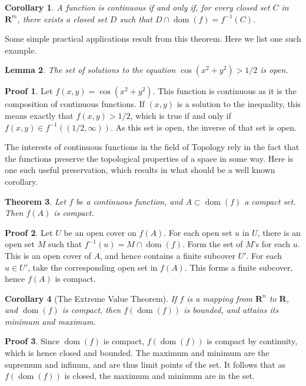 \documentclass[12pt]{amsbook}
\theoremstyle{plain}
\newtheorem{theorem}{Theorem}
\newtheorem{lemma}[theorem]{Lemma}
\newtheorem{corollary}[theorem]{Corollary}
\theoremstyle{definition}
\newtheorem*{prf}{Proof}
\DeclareMathOperator{\dom}{dom}
\begin{document}
\begin{corollary}
  A function is continuous if and only if, for every closed set $C$ in $\mathbf{R}^m$, there exists a closed set $D$ such that $D \cap \dom(f) = f^{-1}(C)$.
\end{corollary}

Some simple practical applications result from this theorem. Here we list one such example.

\begin{lemma}
  The set of solutions to the equation $\cos(x^2 + y^2) > 1/2$ is open.
\end{lemma}
\begin{prf}
  Let $f(x,y) = \cos(x^2 + y^2)$. This function is continuous as it is the composition of continuous functions. If $(x,y)$ is a solution to the inequality, this means exactly that $f(x,y) > 1/2$, which is true if and only if $f(x,y) \in f^{-1}((1/2, \infty))$. As this set is open, the inverse of that set is open.
\end{prf}

The interests of continuous functions in the field of Topology rely in the fact that the functions preserve the topological properties of a space in some way. Here is one such useful preservation, which results in what should be a well known corollary.

\begin{theorem}
  Let $f$ be a continuous function, and $A \subset \dom(f)$ a compact set. Then $f(A)$ is compact.
\end{theorem}
\begin{prf}
  Let $U$ be an open cover on $f(A)$. For each open set $u$ in $U$, there is an open set $M$ such that $f^{-1}(u) = M \cap \dom(f)$. Form the set of $M$'s for each $u$. This is an open cover of $A$, and hence contains a finite subcover $U'$. For each $u \in U'$, take the corresponding open set in $f(A)$. This forms a finite subcover, hence $f(A)$ is compact.
\end{prf}

\begin{corollary}[The Extreme Value Theorem]
  If $f$ is a mapping from $\mathbf{R}^n$ to $\mathbf{R}$, and $\dom(f)$ is compact, then $f(\dom(f))$ is bounded, and attains its minimum and maximum.
\end{corollary}
\begin{prf}
  Since $\dom(f)$ is compact, $f(\dom(f))$ is compact by continuity, which is hence closed and bounded. The maximum and minimum are the supremum and infinum, and are thus limit points of the set. It follows that as $f(\dom(f))$ is closed, the maximum and minimum are in the set.
\end{prf}
\end{document}
